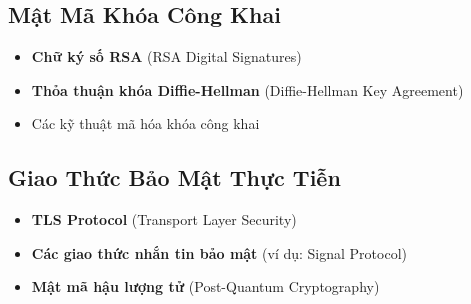\subsection{Mật Mã Khóa Công Khai}
\begin{itemize}
\item \textbf{Chữ ký số RSA} (RSA Digital Signatures)
\item \textbf{Thỏa thuận khóa Diffie-Hellman} (Diffie-Hellman Key Agreement)
\item Các kỹ thuật mã hóa khóa công khai
\end{itemize}

\subsection{Giao Thức Bảo Mật Thực Tiễn}
\begin{itemize}
\item \textbf{TLS Protocol} (Transport Layer Security)
\item \textbf{Các giao thức nhắn tin bảo mật} (ví dụ: Signal Protocol)
\item \textbf{Mật mã hậu lượng tử} (Post-Quantum Cryptography)
\end{itemize}